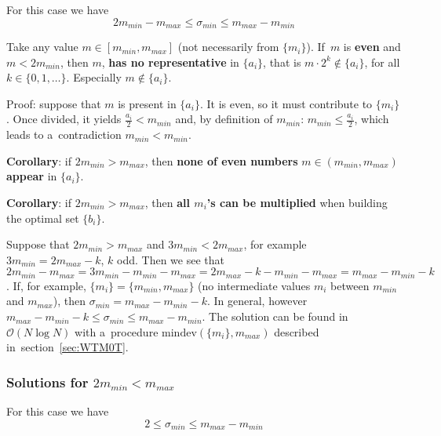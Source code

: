 \documentclass[paper=a4,parskip=half,DIV=12]{leetcode}
\begin{document}
For this case we have
\begin{equation}
  2 m_{min} - m_{max} \le \sigma_{min} \le m_{max} - m_{min}
  \label{eq:9W8Z2}
\end{equation}

Take any value $m \in [m_{min}, m_{max}]$ (not necessarily from $\{m_i\}$).
If~$m$ is \textbf{even} and $m < 2 m_{min}$, then $m$, \textbf{has no
representative} in $\{a_i\}$, that is $m\cdot 2^k \notin \{a_i\}$, for all $k
\in \{ 0,1,\dots \}$. Especially $m \notin \{a_i\}$.

Proof: suppose that $m$ is present in $\{a_i\}$. It is even, so it must
contribute to $\{m_i\}$. Once divided, it yields $\frac{a_i}{2} < m_{min}$ and,
by definition of $m_{min}$: $m_{min} \le \frac{a_i}{2}$, which leads to
a~contradiction $m_{min} < m_{min}$.

\textbf{Corollary}: if $2 m_{min} > m_{max}$, then \textbf{none of even
numbers} $m \in (m_{min}, m_{max})$ \textbf{appear} in $\{a_i\}$.

\textbf{Corollary}: if $2 m_{min} > m_{max}$, then \textbf{all $m_i$'s can be
multiplied} when building the optimal set $\{b_i\}$.

Suppose that $2 m_{min} > m_{max}$ and $3 m_{min} < 2 m_{max}$, for example
$3 m_{min} = 2 m_{max} - k$, $k$ odd. Then we see that $2 m_{min} - m_{max} =
3 m_{min} - m_{min} - m_{max} = 2 m_{max} - k - m_{min} - m_{max} = m_{max} - m_{min} - k$.
If, for example, $\{ m_i \} = \{ m_{min}, m_{max} \}$ (no intermediate values
$m_i$ between $m_{min}$ and $m_{max}$), then $\sigma_{min} = m_{max} - m_{min} - k$.
In general, however $m_{max} - m_{min} - k \le \sigma_{min} \le m_{max} -
m_{min}$. The solution can be found in $\mathcal{O}(N \log{N})$ with
a~procedure $\mathrm{mindev}(\{ m_i \}, m_{max})$ described
in~section~\ref{sec:WTM0T}.

\subsubsection{Solutions for $2 m_{min} < m_{max}$}
\label{sec:2SBRZ}

For this case we have
\begin{equation}
  2 \le \sigma_{min} \le m_{max} - m_{min}
  \label{eq:0Y3X2}
\end{equation}
\end{document}

